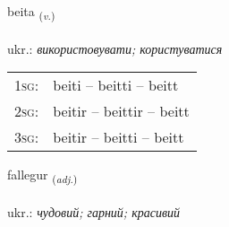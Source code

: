 \documentclass[frontgrid, backgrid]{flacards}\usepackage[]{graphicx}\usepackage[]{xcolor}
\begin{document}
\renewcommand{\blhead}{\vskip5pt {\small\bfseries\footnotesize Sagnorð | дієслово }}
\renewcommand{\bcfoot}{\vskip5pt \hspace{2pt}{\small\bfseries\footnotesize 1K}}


{beita \small{\textsubscript{(\textit{v.})}} \\[1ex] %
\textphonetic{[peiːta]} \\
ukr.: \emph{використовувати; користуватися} \\  [2ex]
\renewcommand*{\arraystretch}{0.8}
\begin{tabular}{p{1cm}l}
\textsc{1sg}: & beiti -- beitti -- beitt \\ 
\textsc{2sg}: & beitir -- beittir -- beitt \\ 
\textsc{3sg}: & beitir -- beitti -- beitt \\ 
\end{tabular}
}

\renewcommand{\flhead}{\vskip5pt \fboxsep=0pt {\small\bfseries\footnotesize Lýsingarorð | прикметник}}
\renewcommand{\fcfoot}{\vskip5pt \fboxsep=0pt \hspace{2pt}{\small\bfseries\footnotesize 1K}}

\renewcommand{\blhead}{\vskip5pt {\small\bfseries\footnotesize Lýsingarorð | прикметник }}
\renewcommand{\bcfoot}{\vskip5pt \hspace{2pt}{\small\bfseries\footnotesize 1K}}


{fallegur \small{\textsubscript{(\textit{adj.})}} \\[1ex] %
\textphonetic{[fatlɛɣʏr]} \\
ukr.: \emph{чудовий; гарний; красивий} \\  [2ex]
\renewcommand*{\arraystretch}{0.8}
}
\end{document}
